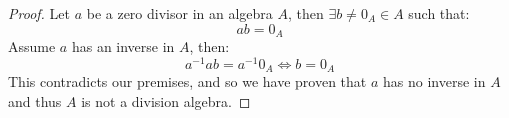 \begin{proof}
	Let $a$ be a zero divisor in an algebra $A$, then $\exists b \neq 0_A \in A$ such that:
	\[ab = 0_A\]
	Assume $a$ has an inverse in $A$, then:
	\[a^{-1}ab = a^{-1}0_A \Leftrightarrow b = 0_A\]
	This contradicts our premises, and so we have proven that $a$ has no inverse in $A$ and thus $A$ is not a division algebra.
\end{proof}
